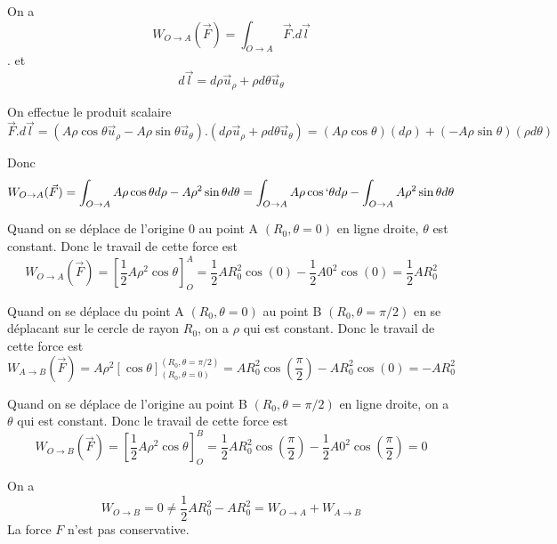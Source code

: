 \documentclass[]{book}
\theoremstyle{definition}
\begin{document}
On a 
$$W_{O \to A}(\vec{F}) = \int_{O \to A} \vec{F}.d\vec{l}$$.
et
$$d\vec{l} = d\rho\vec{u}_{\rho} + \rho d\theta\vec{u}_{\theta}$$

On effectue le produit scalaire
$$\vec{F}.d\vec{l} = (A \rho \cos \theta\vec{u}_{\rho} - A \rho \sin \theta\vec{u}_{\theta}).(d\rho\vec{u}_{\rho} + \rho d\theta\vec{u}_{\theta}) = (A \rho \cos \theta) (d\rho) + (-A \rho \sin \theta)(\rho d\theta)$$

Donc 
$$W_{O \to A}(\vec{F}) = \int_{O \to A} {A \rho \cos \theta d\rho - A \rho^2 \sin \theta d\theta} = \int_{O \to A} {A \rho \cos` \theta d\rho} - \int_{O \to A} {A \rho^2 \sin \theta d\theta}$$

Quand on se d\'eplace de l'origine 0 au point A $(R_0,\theta = 0)$ en ligne droite, $\theta$ est constant. Donc le travail de cette force est
$$W_{O \to A}(\vec{F})=\left[ \frac{1}{2}A\rho^2 \cos \theta \right]_{O}^{A} = \frac{1}{2}AR_0^2\cos(0) - \frac{1}{2}A0^2\cos(0) = \frac{1}{2}AR_0^2$$

Quand on se d\'eplace du point A $(R_0,\theta = 0)$ au point B $(R_0, \theta=\pi/2)$ en se d\'eplacant sur le cercle de rayon $R_0$, on a $\rho$ qui est constant. Donc le travail de cette force est
$$W_{A \to B}(\vec{F})= A\rho^2\left[\cos \theta \right]_{(R_0,\theta=0)}^{(R_0,\theta=\pi/2)} = AR_0^2\cos(\frac{\pi}{2}) - AR_0^2\cos(0) = -AR_0^2$$

Quand on se d\'eplace de l'origine au point B $(R_0, \theta=\pi/2)$ en ligne droite, on a $\theta$ qui est constant. Donc le travail de cette force est
$$W_{O \to B}(\vec{F})=\left[ \frac{1}{2}A\rho^2 \cos \theta \right]_{O}^{B} = \frac{1}{2}AR_0^2\cos(\frac{\pi}{2}) - \frac{1}{2}A0^2\cos(\frac{\pi}{2}) = 0$$

On a 
$$W_{O \to B} = 0 \neq \frac{1}{2}AR_0^2 - AR_0^2 = W_{O \to A} + W_{A \to B}$$
La force $F$ n'est pas conservative. 
\end{document}
